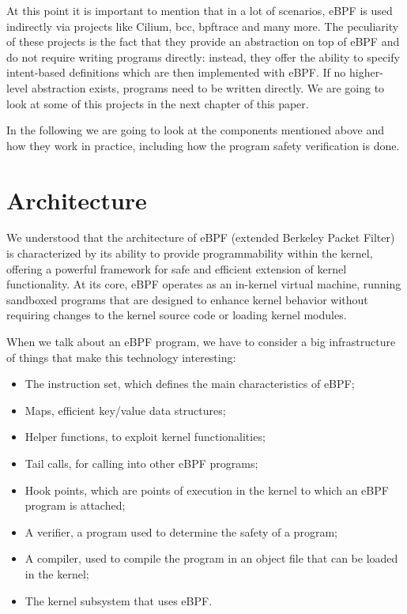 At this point it is important to mention that in a lot of scenarios, eBPF is used indirectly via projects like Cilium, bcc, bpftrace and many more. 
The peculiarity of these projects is the fact that they provide an abstraction on top of eBPF and do not require writing programs directly: instead, they offer the ability to specify intent-based definitions which are then implemented with eBPF.
If no higher-level abstraction exists, programs need to be written directly. 
We are going to look at some of this projects in the next chapter of this paper.

In the following we are going to look at the  components mentioned above and how they work in practice, including how the program safety verification is done.

\section{Architecture}

We understood that the architecture of eBPF (extended Berkeley Packet Filter) is characterized by its ability to provide programmability within the kernel, offering a powerful framework for safe and efficient extension of kernel functionality. 
At its core, eBPF operates as an in-kernel virtual machine, running sandboxed programs that are designed to enhance kernel behavior without requiring changes to the kernel source code or loading kernel modules.

When we talk about an eBPF program, we have to consider a big infrastructure of things that make this technology interesting:

\begin{itemize}
	\item The instruction set, which defines the main characteristics of eBPF;
	\item Maps, efficient key/value data structures;
	\item Helper functions, to exploit kernel functionalities;
	\item Tail calls, for calling into other eBPF programs;
	\item Hook points, which are points of execution in the kernel to which an eBPF 
		program	is attached;
	\item A verifier, a program used to determine the safety of a program;
	\item A compiler, used to compile the program in an object file that can be loaded
		in the kernel; 
	\item The kernel subsystem that uses eBPF.
\end{itemize}

